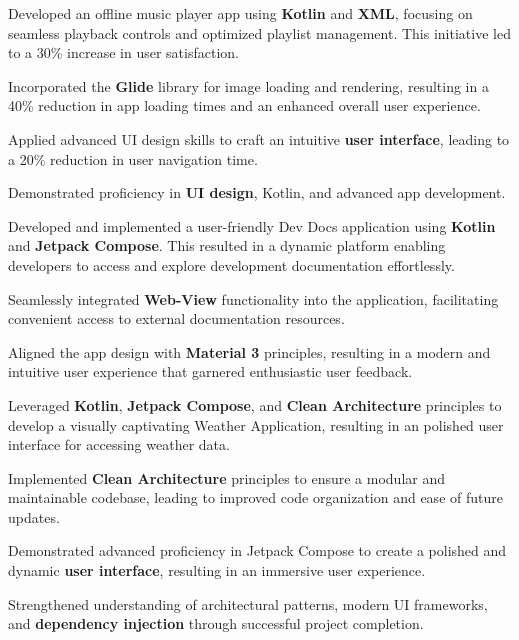 \documentclass[bold]{deedy-resume-openfont}
\begin{document}
\begin{minipage}[t]{0.66\textwidth}
\begin{tightemize}
    \item Developed an offline music player app using \textbf{Kotlin} and \textbf{XML}, focusing on seamless playback controls and optimized playlist management. This initiative led to a 30\% increase in user satisfaction.
    \item Incorporated the \textbf{Glide} library for image loading and rendering, resulting in a 40\% reduction in app loading times and an enhanced overall user experience.
    \item Applied advanced UI design skills to craft an intuitive \textbf{user interface}, leading to a 20\% reduction in user navigation time.
    \item Demonstrated proficiency in \textbf{UI design}, Kotlin, and advanced app development.
\end{tightemize}
\sectionsep

\begin{tightemize}
\item Developed and implemented a user-friendly Dev Docs application using \textbf{Kotlin} and \textbf{Jetpack Compose}. This resulted in a dynamic platform enabling developers to access and explore development documentation effortlessly.
\item Seamlessly integrated \textbf{Web-View} functionality into the application, facilitating convenient access to external documentation resources.
\item Aligned the app design with \textbf{Material 3} principles, resulting in a modern and intuitive user experience that garnered enthusiastic user feedback.
\end{tightemize}
\sectionsep

\begin{tightemize}
\item Leveraged \textbf{Kotlin}, \textbf{Jetpack Compose}, and \textbf{Clean Architecture} principles to develop a visually captivating Weather Application, resulting in an polished user interface for accessing weather data.
\item Implemented \textbf{Clean Architecture} principles to ensure a modular and maintainable codebase, leading to improved code organization and ease of future updates.
\item Demonstrated advanced proficiency in Jetpack Compose to create a polished and dynamic \textbf{user interface}, resulting in an immersive user experience.
\item Strengthened understanding of architectural patterns, modern UI frameworks, and \textbf{dependency injection} through successful project completion.
\end{tightemize}
\sectionsep


\end{minipage} 
\end{document}
